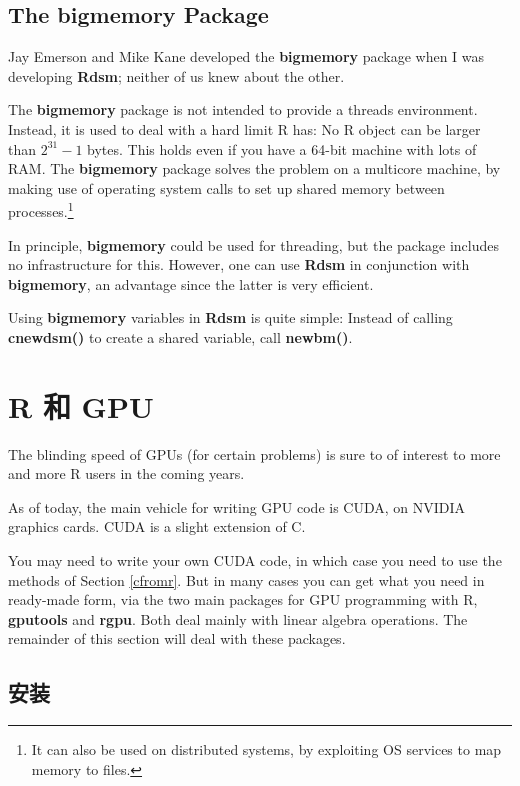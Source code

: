 \subsection{The bigmemory Package}
\label{bigmemory}

Jay Emerson and Mike Kane developed the {\bf bigmemory} package when I
was developing {\bf Rdsm}; neither of us knew about the other.

The {\bf bigmemory} package is not intended to provide a threads
environment.  Instead, it is used to deal with a hard limit R has:
No R object can be larger than $2^{31}-1$ bytes.  This holds even if you
have a 64-bit machine with lots of RAM.  The {\bf bigmemory} package
solves the problem on a multicore machine, by making use of operating
system calls to set up shared memory between processes.\footnote{It can
also be used on distributed systems, by exploiting OS services to map
memory to files.}

In principle, {\bf bigmemory} could be used for threading, but the
package includes no infrastructure for this.  However, one can use {\bf
Rdsm} in conjunction with {\bf bigmemory}, an advantage since the latter
is very efficient.

Using {\bf bigmemory} variables in {\bf Rdsm} is quite simple:  Instead
of calling {\bf cnewdsm()} to create a shared variable, call {\bf newbm()}.

\section{R 和 GPU}

The blinding speed of GPUs (for certain problems) is sure to of interest
to more and more R users in the coming years.

As of today, the main vehicle for writing GPU code is CUDA, on NVIDIA
graphics cards.  CUDA is a slight extension of C.

You may need to write your own CUDA code, in which case you need to use
the methods of Section \ref{cfromr}.  But in many cases you can get what
you need in ready-made form, via the two main packages for GPU programming
with R, {\bf gputools} and {\bf rgpu}.  Both deal mainly with linear
algebra operations.  The remainder of this section will deal with these
packages.

\subsection{安装}
\label{gpuinstall}

